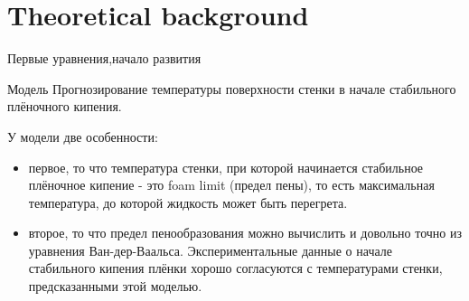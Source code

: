 \section{Theoretical background}
\begin{frame}{Первые уравнения,начало развития}
\begin{block}{Модель}
Прогнозирование температуры поверхности стенки в начале стабильного плёночного кипения.
\end{block}
\vspace{0.10cm}
 У модели две особенности:
  \vspace{0.05cm}
 \begin{itemize}
\item первое, то что температура стенки, при которой начинается стабильное плёночное кипение - это foam limit (предел пены), то есть максимальная температура, до которой жидкость может быть перегрета.
 \vspace{0.05cm}
\item второе, то что предел пенообразования можно вычислить и довольно точно из уравнения Ван-дер-Ваальса. Экспериментальные  данные о начале стабильного кипения плёнки хорошо согласуются с температурами стенки, предсказанными этой моделью. 
\end{itemize}
\end{frame}